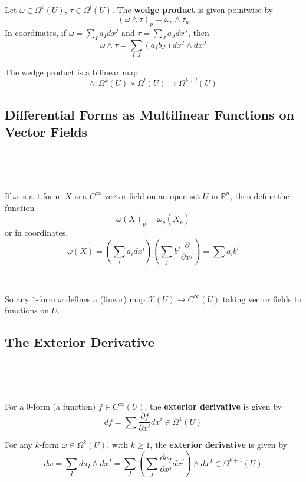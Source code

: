 \documentclass{article}
\begin{document}
\begin{definition}
  \

  Let $\omega \in \Omega^k(U)$, $\tau \in \Omega^l(U)$. The \textbf{wedge product} is given pointwise by $$(\omega \wedge \tau)_p = \omega_p \wedge \tau_p$$In coordinates, if $\omega = \sum_{I} a_I dx^I$ and $\tau = \sum_J a_J dx^J$, then $$\omega \wedge \tau = \sum_{I,J} (a_Ib_J) dx^I \wedge dx^J$$

  The wedge product is a bilinear map $$\wedge: \Omega^k(U) \times \Omega^l(U) \to \Omega^{k+l}(U)$$
\end{definition}

\subsection{Differential Forms as Multilinear Functions on Vector Fields}
\

\begin{definition}
  \

  If $\omega$ is a $1$-form, $X$ is a $C^\infty$ vector field on an open set $U$ in $\mathbb{R}^n$, then define the function $$\omega(X)_p = \omega_p(X_p)$$or in coordinates, $$\omega(X) = (\sum_i a_idx^i)(\sum_j b^j \frac{\partial}{\partial x^j}) = \sum a_ib^i$$
\end{definition}

\begin{remark}
  \

  So any $1$-form $\omega$ defines a (linear) map $\mathcal{X}(U) \to C^\infty(U)$ taking vector fields to functions on $U$.
\end{remark}

\subsection{The Exterior Derivative}
\

\begin{definition}
  \

  For a $0$-form (a function) $f \in C^\infty(U)$, the \textbf{exterior derivative} is given by $$df = \sum \frac{\partial f}{\partial x^i} d x^i \in \Omega^1(U)$$

  For any $k$-form $\omega \in \Omega^k(U)$, with $k \geq 1$, the \textbf{exterior derivative} is given by $$d\omega = \sum_I da_I\wedge dx^I = \sum_I (\sum_j \frac{\partial a_I}{\partial x^j} dx^j) \wedge dx^I \in \Omega^{k+1}(U)$$
\end{definition}
\end{document}
